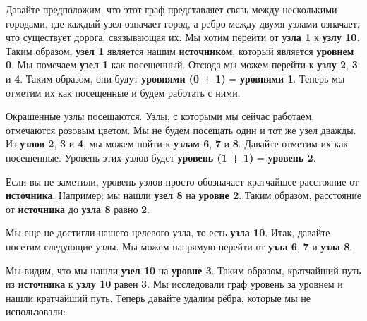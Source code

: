 Давайте предположим, что этот граф представляет связь между несколькими городами, где каждый узел означает город, а ребро между двумя узлами означает, что существует дорога, связывающая их. Мы хотим перейти от \textbf{узла 1} к \textbf{узлу 10}. Таким образом, \textbf{узел 1} является нашим \textbf{источником}, который является \textbf{уровнем 0}. Мы помечаем \textbf{узел 1} как посещенный. Отсюда мы можем перейти к \textbf{узлу 2}, \textbf{3} и \textbf{4}. Таким образом, они будут \textbf{уровнями (0 + 1)} = \textbf{уровнями 1}. Теперь мы отметим их как посещенные и будем работать с ними.

\begin{center}
\end{center}

Окрашенные узлы посещаются. Узлы, с которыми мы сейчас работаем, отмечаются розовым цветом. Мы не будем посещать один и тот же узел дважды. Из \textbf{узлов 2}, \textbf{3} и \textbf{4}, мы можем пойти к \textbf{узлам 6}, \textbf{7} и \textbf{8}. Давайте отметим их как посещенные. Уровень этих узлов будет \textbf{уровень (1 + 1)} = \textbf{уровень 2}.

\begin{center}
\end{center}

Если вы не заметили, уровень узлов просто обозначает кратчайшее расстояние от \textbf{источника}. Например: мы нашли \textbf{узел 8} на \textbf{уровне 2}. Таким образом, расстояние от \textbf{источника} до \textbf{узла 8} равно \textbf{2}.

\vspace{\baselineskip}

Мы еще не достигли нашего целевого узла, то есть \textbf{узла 10}. Итак, давайте посетим следующие узлы. Мы можем напрямую перейти от \textbf{узла 6}, \textbf{7} и \textbf{узла 8}.

\begin{center}
\end{center}

Мы видим, что мы нашли \textbf{узел 10} на \textbf{уровне 3}. Таким образом, кратчайший путь из \textbf{источника} к \textbf{узлу 10} равен \textbf{3}. Мы исследовали граф уровень за уровнем и нашли кратчайший путь. Теперь давайте удалим рёбра, которые мы не использовали:

\begin{center}
\end{center}

